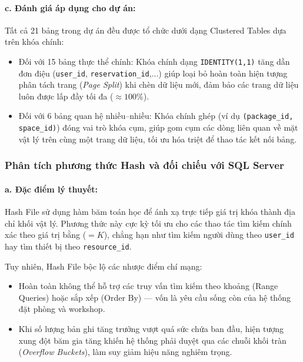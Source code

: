 \paragraph{c. Đánh giá áp dụng cho dự án:}
Tất cả 21 bảng trong dự án đều được tổ chức dưới dạng Clustered Tables dựa trên khóa chính:
\begin{itemize}
    \item Đối với 15 bảng thực thể chính: Khóa chính dạng \texttt{IDENTITY(1,1)} tăng dần đơn điệu (\texttt{user\_id}, \texttt{reservation\_id},...) giúp loại bỏ hoàn toàn hiện tượng phân tách trang (\textit{Page Split}) khi chèn dữ liệu mới, đảm bảo các trang dữ liệu luôn được lấp đầy tối đa ($\approx 100\%$).
    \item Đối với 6 bảng quan hệ nhiều--nhiều: Khóa chính ghép (ví dụ \texttt{(package\_id, space\_id)}) đóng vai trò khóa cụm, giúp gom cụm các dòng liên quan về mặt vật lý trên cùng một trang dữ liệu, tối ưu hóa triệt để thao tác kết nối bảng.
\end{itemize}

\subsubsection{Phân tích phương thức Hash và đối chiếu với SQL Server}

\paragraph{a. Đặc điểm lý thuyết:}
Hash File sử dụng hàm băm toán học để ánh xạ trực tiếp giá trị khóa thành địa chỉ khối vật lý. Phương thức này cực kỳ tối ưu cho các thao tác tìm kiếm chính xác theo giá trị bằng ($= K$), chẳng hạn như tìm kiếm người dùng theo \texttt{user\_id} hay tìm thiết bị theo \texttt{resource\_id}.

Tuy nhiên, Hash File bộc lộ các nhược điểm chí mạng:
\begin{itemize}
    \item Hoàn toàn không thể hỗ trợ các truy vấn tìm kiếm theo khoảng (Range Queries) hoặc sắp xếp (Order By) --- vốn là yêu cầu sống còn của hệ thống đặt phòng và workshop.
    \item Khi số lượng bản ghi tăng trưởng vượt quá sức chứa ban đầu, hiện tượng xung đột băm gia tăng khiến hệ thống phải duyệt qua các chuỗi khối tràn (\textit{Overflow Buckets}), làm suy giảm hiệu năng nghiêm trọng.
\end{itemize}

